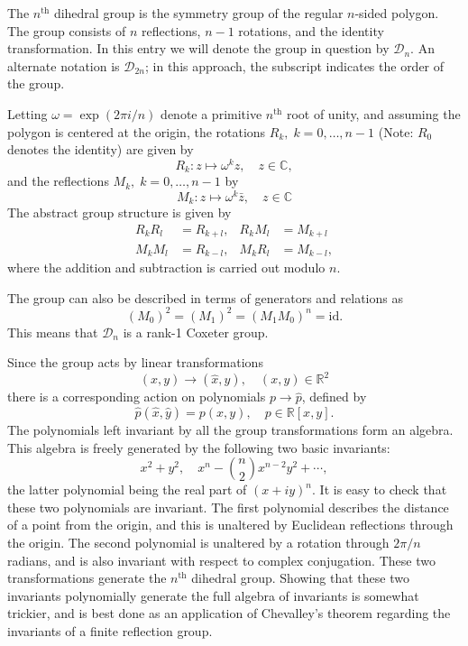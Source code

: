 \documentclass[12pt]{article}
\newcommand{\reals}{\mathbb{R}}
\newcommand{\cnums}{\mathbb{C}}
\newcommand{\lp}{\left(}
\newcommand{\rp}{\right)}
\newcommand{\supth}{^{\text{th}}}
\newcommand{\cD}{\mathcal{D}}
\begin{document}
The $n^{\text{th}}$ dihedral group is the symmetry group of
the regular $n$-sided polygon.  The group consists of $n$ reflections,
$n-1$ rotations, and the identity transformation.  In this entry we will denote the group in question by
$\cD_n$.
An alternate notation is $\cD_{2n}$; in this approach, the subscript indicates the order of the group.  

Letting
$\omega=\exp(2\pi i/n)$ denote a primitive $n^{\text{th}}$ root of
unity, and assuming the polygon is centered at the origin, the
rotations $R_k,\; k=0,\ldots,n-1$ (Note: $R_0$ denotes the identity)
are given by
$$R_k:z \mapsto \omega^k z,\quad z\in\cnums,$$
and the reflections $M_k,\; k=0,\ldots,n-1$ by
$$M_k: z\mapsto \omega^k \bar{z},\quad z\in\cnums$$
The abstract group structure is given by
\begin{align*}
R_k R_l &= R_{k+l}, &  R_k M_l &= M_{k+l}\\
M_k M_l &= R_{k-l}, &  M_k R_l &= M_{k-l},
\end{align*}
where the addition and subtraction is carried out modulo $n$. 

The group can also be described in terms of generators and relations as
$$\lp M_0\rp^2 =\lp M_1\rp^2 = (M_1 M_0)^n = \mathrm{id}.$$
This means that $\cD_n$ is a rank-1 Coxeter group.

Since the group acts by linear transformations
$$(x,y)\to(\hat{x},\hat{y}),\quad (x,y)\in \reals^2$$
there is a
corresponding action on polynomials $p\to\hat{p}$, defined by
$$\hat{p}(\hat{x},\hat{y}) = p(x,y),\quad p\in \reals[x,y].$$
The polynomials
left invariant by all the group transformations form an algebra.  This
algebra is freely generated by the following two basic invariants:
$$x^2+y^2,\quad x^n-\binom{n}{2} x^{n-2}y^2 + \cdots,$$
the latter
polynomial being the real part of $(x+iy)^n$.  It is easy to check
that these two polynomials are invariant.  The first polynomial
describes the distance of a point from the origin, and this is
unaltered by Euclidean reflections through the origin.  The second
polynomial is unaltered by a rotation through $2\pi/n$ radians, and is
also invariant with respect to complex conjugation.  These two
transformations generate the $n\supth$ dihedral group.  Showing that
these two invariants polynomially generate the full algebra of
invariants is somewhat trickier, and is best done as an application of
Chevalley's theorem regarding the invariants of a finite reflection
group.
\end{document}
